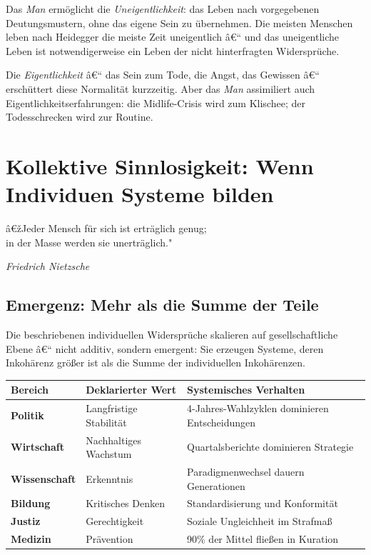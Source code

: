 ﻿\documentclass[12pt, a4paper]{article}
\begin{document}
Das \emph{Man} ermöglicht die \emph{Uneigentlichkeit}: das Leben nach
vorgegebenen Deutungsmustern, ohne das eigene Sein zu übernehmen. Die meisten
Menschen leben nach Heidegger die meiste Zeit uneigentlich â€“ und das uneigentliche
Leben ist notwendigerweise ein Leben der nicht hinterfragten Widersprüche.

Die \emph{Eigentlichkeit} â€“ das Sein zum Tode, die Angst, das Gewissen â€“
erschüttert diese Normalität kurzzeitig. Aber das \emph{Man} assimiliert auch
Eigentlichkeitserfahrungen: die Midlife-Crisis wird zum Klischee; der Todesschrecken
wird zur Routine.

\section{Kollektive Sinnlosigkeit: Wenn Individuen Systeme bilden}

\epigraph{â€žJeder Mensch für sich ist erträglich genug;\\
in der Masse werden sie unerträglich."}{\textit{Friedrich Nietzsche}}

\subsection{Emergenz: Mehr als die Summe der Teile}

Die beschriebenen individuellen Widersprüche skalieren auf gesellschaftliche
Ebene â€“ nicht additiv, sondern emergent: Sie erzeugen Systeme, deren
Inkohärenz größer ist als die Summe der individuellen Inkohärenzen.

\medskip
\begin{tabular}{>{\bfseries}p{3.5cm} p{5cm} p{5cm}}
\toprule
Bereich & Deklarierter Wert & Systemisches Verhalten \\
\midrule
Politik & Langfristige Stabilität & 4-Jahres-Wahlzyklen dominieren Entscheidungen \\
Wirtschaft & Nachhaltiges Wachstum & Quartalsberichte dominieren Strategie \\
Wissenschaft & Erkenntnis & Paradigmenwechsel dauern Generationen \\
Bildung & Kritisches Denken & Standardisierung und Konformität \\
Justiz & Gerechtigkeit & Soziale Ungleichheit im Strafmaß \\
Medizin & Prävention & 90\% der Mittel fließen in Kuration \\
\bottomrule
\end{tabular}
\medskip
\end{document}

